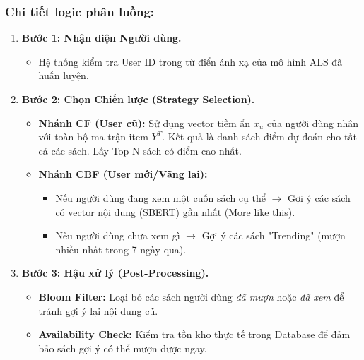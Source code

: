 \subsubsection{Chi tiết logic phân luồng:}
\begin{enumerate}
    \item \textbf{Bước 1: Nhận diện Người dùng.}
    \begin{itemize}
        \item Hệ thống kiểm tra User ID trong từ điển ánh xạ của mô hình ALS đã huấn luyện.
    \end{itemize}
    
    \item \textbf{Bước 2: Chọn Chiến lược (Strategy Selection).}
    \begin{itemize}
        \item \textbf{Nhánh CF (User cũ):} Sử dụng vector tiềm ẩn $x_u$ của người dùng nhân với toàn bộ ma trận item $Y^T$. Kết quả là danh sách điểm dự đoán cho tất cả các sách. Lấy Top-N sách có điểm cao nhất.
        \item \textbf{Nhánh CBF (User mới/Vãng lai):}
        \begin{itemize}
            \item Nếu người dùng đang xem một cuốn sách cụ thể $\rightarrow$ Gợi ý các sách có vector nội dung (SBERT) gần nhất (More like this).
            \item Nếu người dùng chưa xem gì $\rightarrow$ Gợi ý các sách "Trending" (mượn nhiều nhất trong 7 ngày qua).
        \end{itemize}
    \end{itemize}

    \item \textbf{Bước 3: Hậu xử lý (Post-Processing).}
    \begin{itemize}
        \item \textbf{Bloom Filter:} Loại bỏ các sách người dùng \textit{đã mượn} hoặc \textit{đã xem} để tránh gợi ý lại nội dung cũ.
        \item \textbf{Availability Check:} Kiểm tra tồn kho thực tế trong Database để đảm bảo sách gợi ý có thể mượn được ngay.
    \end{itemize}
\end{enumerate}













